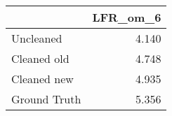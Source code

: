 \begin{tabular}{lr}
\toprule
{} & LFR_om_6 \\
\midrule
Uncleaned    &    4.140 \\
Cleaned old  &    4.748 \\
Cleaned new  &    4.935 \\
Ground Truth &    5.356 \\
\bottomrule
\end{tabular}
